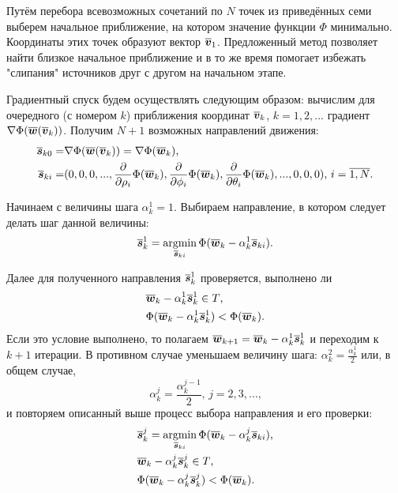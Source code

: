 Путём перебора всевозможных сочетаний по $N$ точек из приведённых семи выберем начальное приближение, на котором значение функции $\Phi$ минимально. Координаты этих точек образуют вектор $\boldsymbol{\overline{v}}_1$. Предложенный метод позволяет найти близкое начальное приближение и в то же время помогает избежать "слипания" источников друг с другом на начальном этапе.

Градиентный спуск будем осуществлять следующим образом: вычислим для очередного (с номером $k$) приближения координат $\boldsymbol{\overline{v}}_k$, $k=1,2,...$ градиент $\nabla \Phi(\boldsymbol{\overline{w}}(\boldsymbol{\overline{v}}_k))$. Получим $N + 1$ возможных направлений движения:
\begin{align}
    \boldsymbol{\overline{s}}_{k0} =& \nabla \Phi(\boldsymbol{\overline{w}}(\boldsymbol{\overline{v}}_k))
    =
    \nabla \Phi(\boldsymbol{\overline{w}}_k)
    \text{,}\\
    \boldsymbol{\overline{s}}_{ki} =& (0,0,0,...,
    \frac{\partial}{\partial \rho_i} \Phi(\boldsymbol{\overline{w}}_k),
    \frac{\partial}{\partial \phi_i} \Phi(\boldsymbol{\overline{w}}_k),
    \frac{\partial}{\partial \theta_i} \Phi(\boldsymbol{\overline{w}}_k),
    ...,0,0,0)
    \text{, }
    i = \overline{1,N}
    \text{.}
\end{align}

Начинаем с величины шага $\alpha_k^1 = 1$. Выбираем направление, в котором следует делать шаг данной величины:
\begin{equation}
    \boldsymbol{\overline{s}}_k^1 = \operatorname*{argmin}_{\boldsymbol{\overline{s}}_{ki}} \Phi(\boldsymbol{\overline{w}}_k - \alpha_k^1 \boldsymbol{\overline{s}}_{ki}) \text{.}
\end{equation}

Далее для полученного направления $\boldsymbol{\overline{s}}_k^1$ проверяется, выполнено ли
\begin{align}
    &\boldsymbol{\overline{w}}_k - \alpha_k^1 \boldsymbol{\overline{s}}_k^1 \in T \text{,}\\
    &\Phi(\boldsymbol{\overline{w}}_k - \alpha_k^1 \boldsymbol{\overline{s}}_k^1) < \Phi(\boldsymbol{\overline{w}}_k) \text{.}
\end{align}
Если это условие выполнено, то полагаем $\boldsymbol{\overline{w}}_{k+1} = \boldsymbol{\overline{w}}_{k} - \alpha_k^1 \boldsymbol{\overline{s}}_k^1$ и переходим к $k + 1$ итерации. В противном случае уменьшаем величину шага: $\alpha_k^{2} = \frac{\alpha_k^1}{2}$ или, в общем случае,
\begin{equation}
    \alpha_k^{j} = \frac{\alpha_k^{j - 1}}{2} \text{, } j = 2,3,... \text{,}
\end{equation}
 и повторяем описанный выше процесс выбора направления и его проверки:
\begin{align}
    &\boldsymbol{\overline{s}}_k^j = \operatorname*{argmin}_{\boldsymbol{\overline{s}}_{ki}} \Phi(\boldsymbol{\overline{w}}_k - \alpha_k^j \boldsymbol{\overline{s}}_{ki}) \text{,}\\
    &\boldsymbol{\overline{w}}_k - \alpha_k^j \boldsymbol{\overline{s}}_k^j \in T \text{,}\\
    &\Phi(\boldsymbol{\overline{w}}_k - \alpha_k^j \boldsymbol{\overline{s}}_k^j) < \Phi(\boldsymbol{\overline{w}}_k) \text{.}
\end{align}


